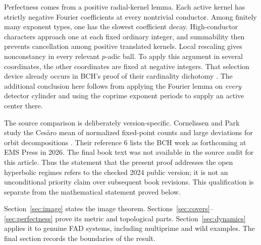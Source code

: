 Perfectness comes from a positive radial-kernel lemma. Each active kernel
has strictly negative Fourier coefficients at every nontrivial conductor.
Among finitely many exponent types, one has the slowest coefficient decay.
High-conductor characters approach one at each fixed ordinary integer,
and summability then prevents cancellation among positive translated
kernels. Local rescaling gives nonconstancy in every relevant $p$-adic
ball. To apply this argument in several coordinates, the other coordinates
are fixed at negative integers. That selection device already occurs in
BCH's proof of their cardinality dichotomy
\cite[proof of Theorem 12.5.1, pp.~132--133]{bch2024}.
The additional conclusion here follows from applying the Fourier lemma
on \emph{every} detector cylinder and using the coprime exponent periods
to supply an active center there.

The source comparison is deliberately version-specific. Cornelissen and
Park study the Ces\`aro mean of normalized fixed-point counts and large
deviations for orbit decompositions \cite[Theorem C and Section 4]{cp2026}.
Their reference 6 lists the BCH work as forthcoming at EMS Press in 2026.
The final book text was not available in the source audit for this article.
Thus the statement that the present proof addresses the open hyperbolic
regimes refers to the checked 2024 public version; it is not an unconditional
priority claim over subsequent book revisions. This qualification is
separate from the mathematical statement proved below.

Section~\ref{sec:image} states the image theorem.
Sections~\ref{sec:covers}--\ref{sec:perfectness} prove its metric and
topological parts. Section~\ref{sec:dynamics} applies it to genuine FAD
systems, including multiprime and wild examples. The final section records
the boundaries of the result.
